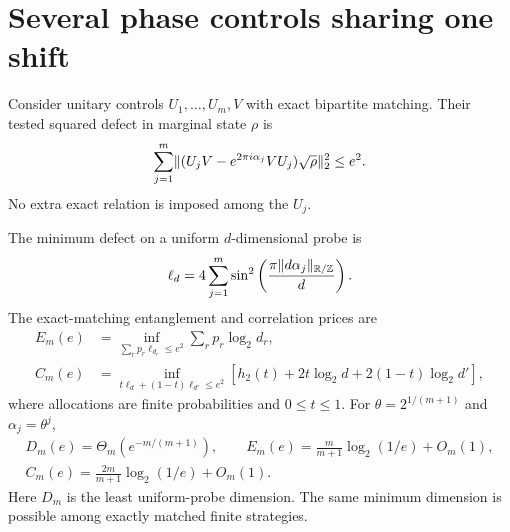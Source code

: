 \section{Several phase controls sharing one shift}\label{app:multi}
Consider unitary controls $U_1,\ldots,U_m,V$ with exact bipartite matching. Their tested squared defect in marginal state $\rho$ is
\[
 \sum_{j=1}^m\lVert(U_jV-e^{2\pi i\alpha_j}VU_j)\sqrt\rho\rVert_2^2\le e^2.
\]
No extra exact relation is imposed among the $U_j$.

\begin{theorem}\label{thm:multi}
The minimum defect on a uniform $d$-dimensional probe is
\begin{equation}
 \ell_d=4\sum_{j=1}^m\sin^2\left(\frac{\pi\lVert d\alpha_j\rVert_{\mathbb R/\mathbb Z}}d\right).\label{eq:ell}
\end{equation}
The exact-matching entanglement and correlation prices are
\begin{align}
 E_m(e)&=\inf_{\sum_rp_r\ell_{d_r}\le e^2}\sum_rp_r\log_2d_r,\label{eq:multiED}\\
 C_m(e)&=\inf_{t\ell_d+(1-t)\ell_{d'}\le e^2}
     [h_2(t)+2t\log_2d+2(1-t)\log_2d'],\label{eq:multiMI}
\end{align}
where allocations are finite probabilities and $0\le t\le1$. For $\theta=2^{1/(m+1)}$ and $\alpha_j=\theta^j$,
\begin{gather}
 D_m(e)=\Theta_m(e^{-m/(m+1)}),\qquad
 E_m(e)=\frac m{m+1}\log_2(1/e)+O_m(1),\\
 C_m(e)=\frac{2m}{m+1}\log_2(1/e)+O_m(1).
\end{gather}
Here $D_m$ is the least uniform-probe dimension. The same minimum dimension is possible among exactly matched finite strategies.
\end{theorem}
